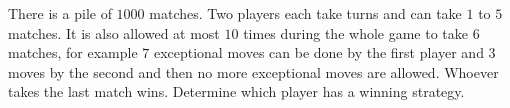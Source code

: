 There is a pile of $1000$ matches. Two players each take turns and can take $1$ to $5$ matches. It is also allowed at most $10$ times during the whole game to take $6$ matches, for example $7$ exceptional moves can be done by the first player and $3$ moves by the second and then no more exceptional moves are allowed. Whoever takes the last match wins. Determine which player has a winning strategy.